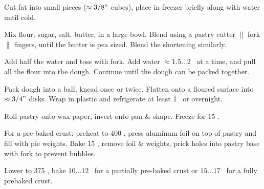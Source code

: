 \begin{preparation}
\item Cut fat into small pieces ($\approx 3/8"$ cubes), place in freezer briefly along with water until cold.

\item Mix flour, sugar, salt, butter, in a large bowl.
	Blend using a pastry cutter $\|$ fork $\|$ fingers, until the butter is pea sized.
	Blend the shortening similarly.

\item Add half the water and toss with fork.
	Add water $\approx 1.5 \dots 2$ \Tablespoon~at a time, and pull all the flour into the dough.
	Continue until the dough can be packed together.

\item Pack dough into a ball, knead once or twice.
	Flatten onto a floured surface into $\approx 3/4"$ disks.
	Wrap in plastic and refrigerate at least 1 \hour~or overnight.

\item Roll pastry onto wax paper, invert onto pan \& shape.
	Freeze for 15 \minute.

\item For a pre-baked crust: preheat to 400 \Fahrenheit, press aluminum foil on top of pastry and fill with pie weights.
	Bake 15 \minute, remove foil \& weights, prick holes into pastry base with fork to prevent bubbles.

\item Lower to 375 \Fahrenheit, bake $10 \dots 12$ \minute~for a partially pre-baked crust or $15 \dots 17$ \minute~for a fully prebaked crust.
\end{preparation}


\recipeend
